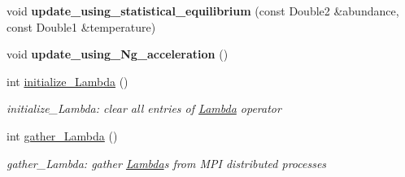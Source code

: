 \begin{DoxyCompactItemize}
\item 
\mbox{\label{structLineProducingSpecies_a95c95f687306608a8aff6e26ae5bd848}} 
void {\bfseries update\+\_\+using\+\_\+statistical\+\_\+equilibrium} (const Double2 \&abundance, const Double1 \&temperature)
\item 
\mbox{\label{structLineProducingSpecies_aea9a3fc9d735fa6b5238c44fd38296aa}} 
void {\bfseries update\+\_\+using\+\_\+\+Ng\+\_\+acceleration} ()
\item 
\mbox{\label{structLineProducingSpecies_a8400c3ec984ab4fc25174c39954342c9}} 
int \mbox{\hyperlink{structLineProducingSpecies_a8400c3ec984ab4fc25174c39954342c9}{initialize\+\_\+\+Lambda}} ()
\begin{DoxyCompactList}\small\item\em initialize\+\_\+\+Lambda\+: clear all entries of \mbox{\hyperlink{structLambda}{Lambda}} operator \end{DoxyCompactList}\item 
\mbox{\label{structLineProducingSpecies_ade61c881ebf614736992e173f8c0cc3c}} 
int \mbox{\hyperlink{structLineProducingSpecies_ade61c881ebf614736992e173f8c0cc3c}{gather\+\_\+\+Lambda}} ()
\begin{DoxyCompactList}\small\item\em gather\+\_\+\+Lambda\+: gather \mbox{\hyperlink{structLambda}{Lambda}}\textquotesingle{}s from M\+PI distributed processes \end{DoxyCompactList}\end{DoxyCompactItemize}
